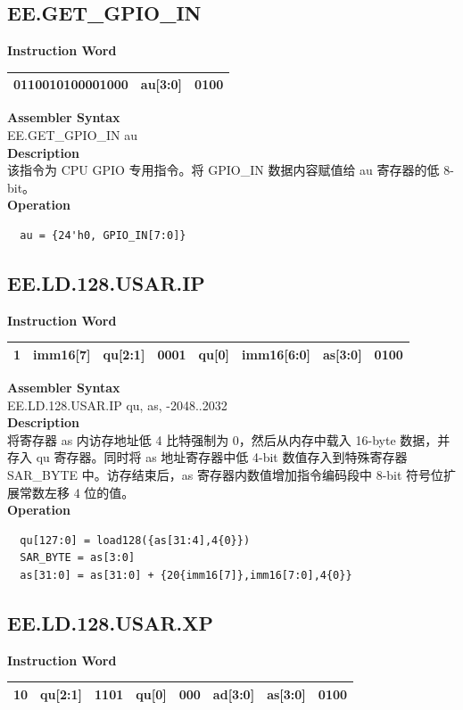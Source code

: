 \clearpage
\subsection{EE.GET\_GPIO\_IN}\label{instruction:EEGETGPIOIN}
\setlength\tabcolsep{6pt}
\textbf{Instruction Word} \\
\begin{tabular}{|c|c|c|}
	\hline
	0110010100001000 & au[3:0] & 0100 \\
	\hline
\end{tabular}

\textbf{Assembler Syntax} \\
EE.GET\_GPIO\_IN au \\
\textbf{Description} \\
该指令为 CPU GPIO 专用指令。将 GPIO\_IN 数据内容赋值给 au 寄存器的低 8-bit。\\
\textbf{Operation}
\begin{lstlisting}
  au = {24'h0, GPIO_IN[7:0]}
\end{lstlisting}

\clearpage
\subsection{EE.LD.128.USAR.IP}\label{instruction:EELD128USARIP}
\setlength\tabcolsep{6pt}
\textbf{Instruction Word} \\
\begin{tabular}{|c|c|c|c|c|c|c|c|}
	\hline
	1 & imm16[7] & qu[2:1] & 0001 & qu[0] & imm16[6:0] & as[3:0] & 0100 \\
	\hline
\end{tabular}

\textbf{Assembler Syntax} \\
EE.LD.128.USAR.IP qu, as, -2048..2032 \\
\textbf{Description} \\
将寄存器 as 内访存地址低 4 比特强制为 0，然后从内存中载入 16-byte 数据，并存入 qu 寄存器。同时将 as 地址寄存器中低 4-bit 数值存入到特殊寄存器 SAR\_BYTE 中。访存结束后，as 寄存器内数值增加指令编码段中 8-bit 符号位扩展常数左移 4 位的值。\\
\textbf{Operation}
\begin{lstlisting}
  qu[127:0] = load128({as[31:4],4{0}})
  SAR_BYTE = as[3:0]
  as[31:0] = as[31:0] + {20{imm16[7]},imm16[7:0],4{0}}
\end{lstlisting}

\clearpage
\subsection{EE.LD.128.USAR.XP}\label{instruction:EELD128USARXP}
\setlength\tabcolsep{6pt}
\textbf{Instruction Word} \\
\begin{tabular}{|c|c|c|c|c|c|c|c|}
	\hline
	10 & qu[2:1] & 1101 & qu[0] & 000 & ad[3:0] & as[3:0] & 0100 \\
	\hline
\end{tabular}

